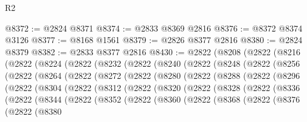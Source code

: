 \begin{lexlean}{R2}
\begin{coremodule}
@8372 := @2824 @8371
@8374 := @2833 @8369 @2816
@8376 := @8372 @8374 @3126
@8377 := @8168 @1561
@8379 := @2826 @8377 @2816
@8380 := @2824 @8379
@8382 := @2833 @8377 @2816
@8430 := @2822
    (@8208
      (@2822
        (@8216
          (@2822
            (@8224
              (@2822
                (@8232
                  (@2822
                    (@8240
                      (@2822
                        (@8248
                          (@2822
                            (@8256
                              (@2822
                                (@8264
                                  (@2822
                                    (@8272
                                      (@2822
                                        (@8280
                                          (@2822
                                            (@8288
                                              (@2822
                                                (@8296
                                                  (@2822
                                                    (@8304
                                                      (@2822
                                                        (@8312
                                                          (@2822
                                                            (@8320
                                                              (@2822
                                                                (@8328
                                                                  (@2822
                                                                    (@8336
                                                                      (@2822
                                                                        (@8344
                                                                          (@2822
                                                                            (@8352
                                                                              (@2822
                                                                                (@8360
                                                                                  (@2822
                                                                                    (@8368
                                                                                      (@2822
                                                                                        (@8376
                                                                                          (@2822
                                                                                            (@8380

\end{coremodule}
\end{lexlean}
